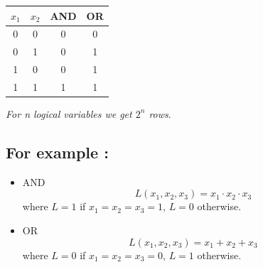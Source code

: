 \documentclass[12pt,openany, tikz,border=10pt]{book}
\begin{document}
  \begin{center}
  \begin{tabular}{ c c | c | c }
      \( x_1 \) & \( x_2 \) & AND & OR \\
      \hline
      0 & 0 & 0 & 0 \\
      0 & 1 & 0 & 1 \\
      1 & 0 & 0 & 1 \\
      1 & 1 & 1 & 1 \\
      
  \end{tabular}
\end{center}


\textit{For n logical variables we get $2^n$ rows}.\newline
\vspace*{-10px}
\subsection*{For example :}
\vspace*{-2px}
\begin{itemize}
  \item[] AND
\vspace*{-5px}
  \begin{equation*}
      L(x_1, x_2, x_3) = x_1 \cdot x_2 \cdot x_3
  \end{equation*}
  where \( L = 1 \) if \( x_1 = x_2 = x_3 = 1 \), \( L = 0 \) otherwise.
  \vspace*{-5px}
  \item[] OR
  \begin{equation*}
      L(x_1, x_2, x_3) = x_1 + x_2 + x_3
  \end{equation*}
  where \( L = 0 \) if \( x_1 = x_2 = x_3 = 0 \), \( L = 1 \) otherwise.
\end{itemize}
\end{document}
